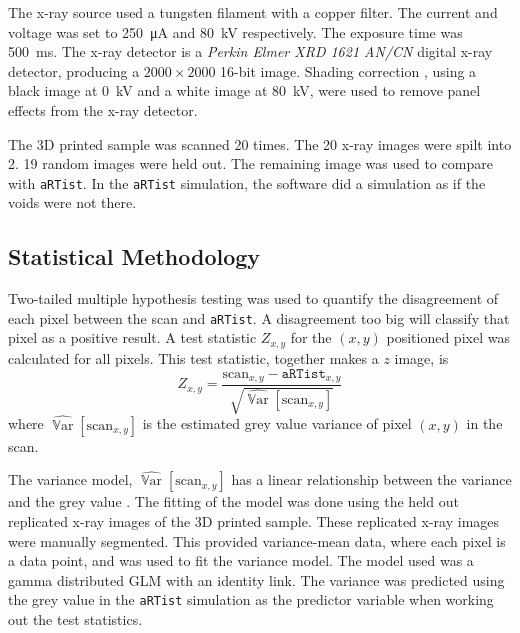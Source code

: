 \documentclass[twocolumn]{article}
\DeclareMathOperator{\variance}{\mathbb{V}ar}
\begin{document}
The x-ray source used a tungsten filament with a copper filter. The current and voltage was set to \SI{250}{\micro\ampere} and \SI{80}{\kilo\volt} respectively. The exposure time was \SI{500}{\milli\second}. The x-ray detector is a \emph{Perkin Elmer XRD 1621 AN/CN} digital x-ray detector, producing a $2000\times 2000$ 16-bit image. Shading correction \citep{young2000shading, munzenmayer2003enhancing}, using a black image at \SI{0}{\kilo\volt} and a white image at \SI{80}{\kilo\volt}, were used to remove panel effects from the x-ray detector.

The 3D printed sample was scanned 20 times. The 20 x-ray images were spilt into 2. 19 random images were held out. The remaining image was used to compare with \texttt{aRTist}. In the \texttt{aRTist} simulation, the software did a simulation as if the voids were not there.

\subsection{Statistical Methodology}

Two-tailed multiple hypothesis testing \citep{pearson1900on, neyman1933on, fisher1970statistical} was used to quantify the disagreement of each pixel between the scan and \texttt{aRTist}. A disagreement too big will classify that pixel as a positive result. A test statistic $Z_{x,y}$ for the $(x,y)$ positioned pixel was calculated for all pixels. This test statistic, together makes a $z$ image, is
\begin{equation}
  Z_{x,y} = 
  \dfrac{
    \text{scan}_{x,y} - \texttt{aRTist}_{x,y}
  }
  {
    \sqrt{\widehat{\variance}\left[\text{scan}_{x,y}\right]}
  }
\end{equation}
where $\widehat{\variance}\left[\text{scan}_{x,y}\right]$ is the estimated grey value variance of pixel $(x,y)$ in the scan.

The variance model, $\widehat{\variance}\left[\text{scan}_{x,y}\right]$ has a linear relationship between the variance and the grey value \citep{yang2010noise}. The fitting of the model was done using the held out replicated x-ray images of the 3D printed sample. These replicated x-ray images were manually segmented. This provided variance-mean data, where each pixel is a data point, and was used to fit the variance model. The model used was a gamma distributed GLM \citep{nelder1972generalized, mccullagh1984generalized} with an identity link. The variance was predicted using the grey value in the \texttt{aRTist} simulation as the predictor variable when working out the test statistics.
\end{document}
